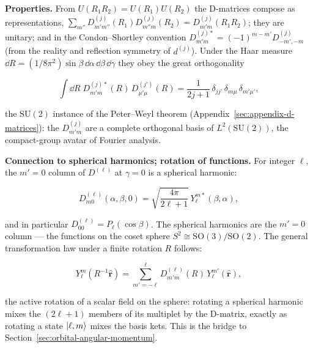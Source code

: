 \medskip\noindent\textbf{Properties.} From $U(R_{1}R_{2})=U(R_{1})U(R_{2})$ the D-matrices compose as representations, $\sum_{m''}D^{(j)}_{m'm''}(R_{1})D^{(j)}_{m''m}(R_{2})=D^{(j)}_{m'm}(R_{1}R_{2})$; they are unitary; and in the Condon--Shortley convention $D^{(j)*}_{m'm}=(-1)^{m-m'}D^{(j)}_{-m',-m}$ (from the reality and reflection symmetry of $d^{(j)}$). Under the Haar measure $\dd R=(1/8\pi^{2})\sin\beta\,\dd\alpha\,\dd\beta\,\dd\gamma$ they obey the great orthogonality
\begin{linenomath}
    \begin{equation*}
        \int\dd R\;D^{(j)*}_{m'm}(R)\,D^{(j')}_{\mu'\mu}(R)=\frac{1}{2j+1}\,\delta_{jj'}\,\delta_{m\mu}\,\delta_{m'\mu'},
    \end{equation*}
\end{linenomath}
the $\mathrm{SU}(2)$ instance of the Peter--Weyl theorem (Appendix~\ref{sec:appendix-d-matrices}): the $D^{(j)}_{m'm}$ are a complete orthogonal basis of $L^{2}(\mathrm{SU}(2))$, the compact-group avatar of Fourier analysis.

\medskip\noindent\textbf{Connection to spherical harmonics; rotation of functions.} For integer $\ell$, the $m'=0$ column of $D^{(\ell)}$ at $\gamma=0$ is a spherical harmonic:
\begin{linenomath}
    \begin{equation}
        D^{(\ell)}_{m0}(\alpha,\beta,0)
        = \sqrt{\frac{4\pi}{2\ell+1}}\,Y_\ell^{m*}(\beta,\alpha),
        \label{eq:D-Y-relation}
    \end{equation}
\end{linenomath}
and in particular $D^{(\ell)}_{00}=P_\ell(\cos\beta)$. The spherical harmonics are the $m'=0$ column --- the functions on the coset sphere $S^{2}\cong\mathrm{SO}(3)/\mathrm{SO}(2)$. The general transformation law under a finite rotation $R$ follows:
\begin{linenomath}
    \begin{equation}
        Y_{\ell}^{m}(R^{-1}\hat{\bm r})=\sum_{m'=-\ell}^{\ell}D^{(\ell)}_{m'm}(R)\,Y_{\ell}^{m'}(\hat{\bm r}),
        \label{eq:Ylm-rotation-ch6}
    \end{equation}
\end{linenomath}
the active rotation of a scalar field on the sphere: rotating a spherical harmonic mixes the $(2\ell+1)$ members of its multiplet by the D-matrix, exactly as rotating a state $\ket{\ell,m}$ mixes the basis kets. This is the bridge to Section~\ref{sec:orbital-angular-momentum}.


